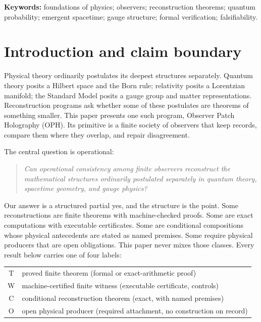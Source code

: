 \documentclass[11pt]{article}
\theoremstyle{remark}
\newcommand{\evT}{\textsf{T}}   %
\newcommand{\evW}{\textsf{W}}   %
\newcommand{\evC}{\textsf{C}}   %
\newcommand{\evO}{\textsf{O}}   %
\begin{document}
\vspace{0.5em}
\noindent\textbf{Keywords:} foundations of physics; observers; reconstruction
theorems; quantum probability; emergent spacetime; gauge structure; formal
verification; falsifiability.

\tableofcontents

\section{Introduction and claim boundary}
\label{sec:intro}

Physical theory ordinarily postulates its deepest structures separately.
Quantum theory posits a Hilbert space and the Born rule; relativity posits a
Lorentzian manifold; the Standard Model posits a gauge group and matter
representations. Reconstruction programs ask whether some of these
postulates are theorems of something smaller. This paper presents one such
program, Observer Patch Holography (OPH). Its primitive is a finite society
of observers that keep records, compare them where they overlap, and repair
disagreement.

The central question is operational:

\begin{quote}
\emph{Can operational consistency among finite observers reconstruct the
mathematical structures ordinarily postulated separately in quantum theory,
spacetime geometry, and gauge physics?}
\end{quote}

Our answer is a structured partial yes, and the structure is the point. Some
reconstructions are finite theorems with machine-checked proofs. Some are
exact computations with executable certificates. Some are conditional
compositions whose physical antecedents are stated as named premises. Some
require physical producers that are open obligations. This paper never mixes
those classes. Every result below carries one of four labels:

\begin{center}
\begin{tabular}{@{}cl@{}}
\toprule
\evT & proved finite theorem (formal or exact-arithmetic proof)\\
\evW & machine-certified finite witness (executable certificate, controls)\\
\evC & conditional reconstruction theorem (exact, with named premises)\\
\evO & open physical producer (required attachment, no construction on record)\\
\bottomrule
\end{tabular}
\end{center}
\end{document}
